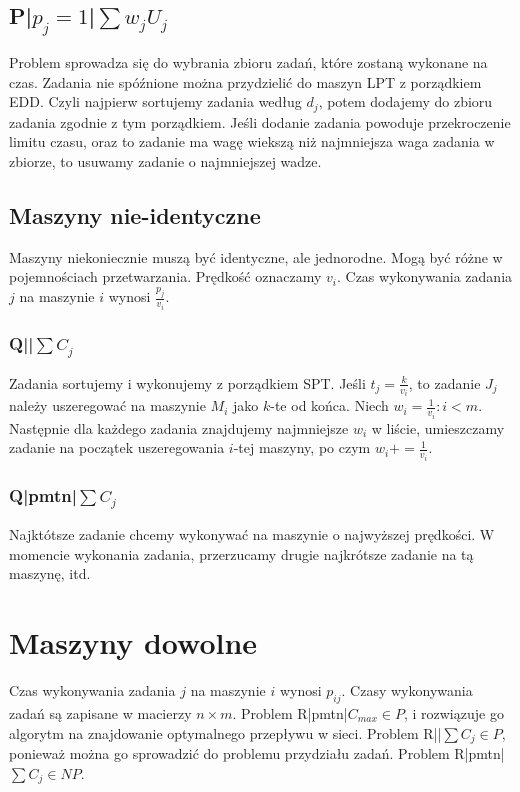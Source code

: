 \documentclass{../notatki}
\begin{document}
\subsection{P|\texorpdfstring{$p_j=1$}{pj=1}|\texorpdfstring{$\sum
w_jU_j$}{sum wjUj}}

Problem sprowadza się do wybrania zbioru zadań, które zostaną wykonane na czas.
Zadania nie spóźnione można przydzielić do maszyn LPT z porządkiem EDD.
Czyli najpierw sortujemy zadania według $d_j$, potem dodajemy do zbioru zadania
zgodnie z tym porządkiem. Jeśli dodanie zadania powoduje przekroczenie limitu
czasu, oraz to zadanie ma wagę wiekszą niż najmniejsza waga zadania w
zbiorze, to usuwamy zadanie o najmniejszej wadze.

\subsection{Maszyny nie-identyczne}

Maszyny niekoniecznie muszą być identyczne, ale jednorodne. Mogą być
różne w pojemnościach
przetwarzania. Prędkość oznaczamy $v_i$. Czas wykonywania zadania $j$
na maszynie $i$ wynosi $\frac{p_j}{v_i}$.

\subsubsection{Q||\texorpdfstring{$\sum C_j$}{sum Cj}}

Zadania sortujemy i wykonujemy z porządkiem SPT. Jeśli $t_j = \frac{k}{v_i}$, to
zadanie $J_j$ należy uszeregować na maszynie $M_i$ jako $k$-te od końca.
Niech $w_i = \frac{1}{v_i}: i < m$. Następnie dla każdego zadania
znajdujemy najmniejsze $w_i$ w liście, umieszczamy zadanie na
początek uszeregowania
$i$-tej maszyny, po czym $w_i += \frac{1}{v_i}$.

\subsubsection{Q|pmtn|\texorpdfstring{$\sum C_j$}{sum Cj}}

Najktótsze zadanie chcemy wykonywać na maszynie o najwyższej
prędkości. W momencie
wykonania zadania, przerzucamy drugie najkrótsze zadanie na tą maszynę, itd.

\section{Maszyny dowolne}

Czas wykonywania zadania $j$ na maszynie $i$ wynosi $p_{ij}$. Czasy wykonywania
zadań są zapisane w macierzy $n \times m$. Problem R|pmtn|$C_{max} \in P$,
i rozwiązuje go algorytm na znajdowanie optymalnego przepływu w sieci. Problem
R||$\sum C_j \in P$, ponieważ można go sprowadzić do problemu przydziału zadań.
Problem R|pmtn|$\sum C_j \in NP$.
\end{document}
